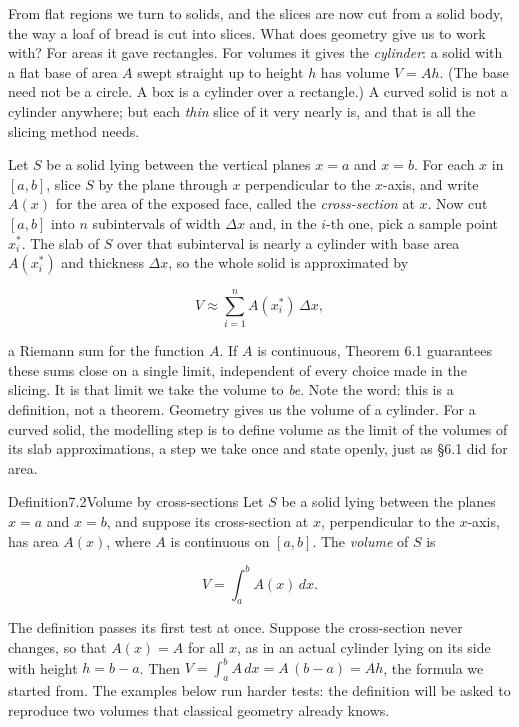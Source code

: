 \documentclass[a4paper,12pt,oneside]{memoir}
\begin{document}
From flat regions we turn to solids, and the slices are now cut from a solid body, the way a loaf of bread is cut into slices. What does geometry give us to work with? For areas it gave rectangles. For volumes it gives the \emph{cylinder}: a solid with a flat base of area \(A\) swept straight up to height \(h\) has volume \(V = Ah\). (The base need not be a circle. A box is a cylinder over a rectangle.) A curved solid is not a cylinder anywhere; but each \emph{thin} slice of it very nearly is, and that is all the slicing method needs.

Let \(S\) be a solid lying between the vertical planes \(x = a\) and \(x = b\). For each \(x\) in \([a, b]\), slice \(S\) by the plane through \(x\) perpendicular to the \(x\)-axis, and write \(A(x)\) for the area of the exposed face, called the \emph{cross-section} at \(x\). Now cut \([a, b]\) into \(n\) subintervals of width \(\Delta x\) and, in the \(i\)-th one, pick a sample point \(x_{i}^{*}\). The slab of \(S\) over that subinterval is nearly a cylinder with base area \(A(x_{i}^{*})\) and thickness \(\Delta x\), so the whole solid is approximated by

\[ V \approx \sum_{i=1}^{n} A(x_{i}^{*})\,\Delta x, \]

a Riemann sum for the function \(A\). If \(A\) is continuous, Theorem 6.1 guarantees these sums close on a single limit, independent of every choice made in the slicing. It is that limit we take the volume to \emph{be}. Note the word: this is a definition, not a theorem. Geometry gives us the volume of a cylinder. For a curved solid, the modelling step is to define volume as the limit of the volumes of its slab approximations, a step we take once and state openly, just as §6.1 did for area.

\begin{envdefinition}{Definition}{7.2}{Volume by cross-sections}
Let \(S\) be a solid lying between the planes \(x = a\) and \(x = b\), and suppose its cross-section at \(x\), perpendicular to the \(x\)-axis, has area \(A(x)\), where \(A\) is continuous on \([a, b]\). The \emph{volume} of \(S\) is

\[ V = \int_{a}^{b} A(x)\,dx. \]
\end{envdefinition}
The definition passes its first test at once. Suppose the cross-section never changes, so that \(A(x) = A\) for all \(x\), as in an actual cylinder lying on its side with height \(h = b - a\). Then \(V = \int_{a}^{b} A\,dx = A\,(b - a) = Ah\), the formula we started from. The examples below run harder tests: the definition will be asked to reproduce two volumes that classical geometry already knows.
\end{document}
